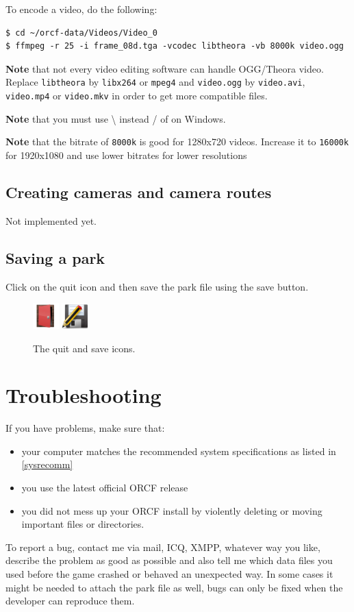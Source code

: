 \documentclass[a4paper]{article}
\newcommand{\cvalue}[1]{\texttt{#1}}
\newcommand{\note}[1]{\textbf{Note} #1 \par}
\begin{document}
To encode a video, do the following:
\begin{lstlisting}
$ cd ~/orcf-data/Videos/Video_0
$ ffmpeg -r 25 -i frame_08d.tga -vcodec libtheora -vb 8000k video.ogg
\end{lstlisting}

\note{that not every video editing software can handle OGG/Theora video. Replace \cvalue{libtheora} by \cvalue{libx264} or \cvalue{mpeg4} and
\cvalue{video.ogg} by \cvalue{video.avi}, \cvalue{video.mp4} or \cvalue{video.mkv} in order to get more compatible files.}
\note{that you must use \textbackslash{} instead / of on Windows.}
\note{that the bitrate of \cvalue{8000k} is good for 1280x720 videos. Increase it to \cvalue{16000k} for 1920x1080 and use lower bitrates
for lower resolutions}

\subsection{Creating cameras and camera routes}
Not implemented yet.

\subsection{Saving a park}
Click on the quit icon and then save the park file using the save button.
\begin{figure}[h]
  \begin{center}
    \includegraphics[width=10mm]{../images/leave.png}
    \includegraphics[width=10mm]{../images/document-save-as.png}
  \end{center}
  \caption{The quit and save icons.}
\end{figure}

\section{Troubleshooting}
If you have problems, make sure that:
\begin{itemize}
  \item your computer matches the recommended system specifications as listed in \ref{sysrecomm}
  \item you use the latest official ORCF release
  \item you did not mess up your ORCF install by violently deleting or moving important files or directories.
\end{itemize}

To report a bug, contact me via mail, ICQ, XMPP, whatever way you like, describe the problem as good as possible and also tell me which
data files you used before the game crashed or behaved an unexpected way. In some cases it might be needed to attach the park file as well,
bugs can only be fixed when the developer can reproduce them.
\end{document}
